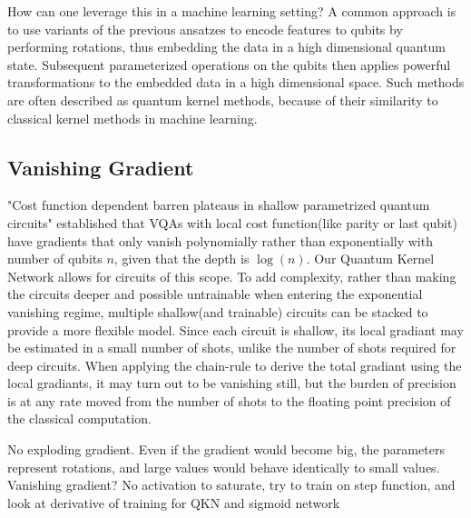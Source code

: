 \documentclass[]{article}
\begin{document}
How can one leverage this in a machine learning setting? A common approach is to use variants of the previous ansatzes to encode features to qubits by performing rotations, thus embedding the data in a high dimensional quantum state. Subsequent parameterized operations on the qubits then applies powerful transformations to the embedded data in a high dimensional space. Such methods are often described as quantum kernel methods, because of their similarity to classical kernel methods in machine learning.

\subsection{Vanishing Gradient}
"Cost function dependent barren plateaus in shallow parametrized quantum circuits" established that VQAs with local cost function(like parity or last qubit) have gradients that only vanish polynomially rather than exponentially with number of qubits $n$, given that the depth is $\log(n)$. Our Quantum Kernel Network allows for circuits of this scope. To add complexity, rather than making the circuits deeper and possible untrainable when entering the exponential vanishing regime, multiple shallow(and trainable) circuits can be stacked to provide a more flexible model. Since each circuit is shallow, its local gradiant may be estimated in a small number of shots, unlike the number of shots required for deep circuits. When applying the chain-rule to derive the total gradiant using the local gradiants, it may turn out to be vanishing still, but the burden of precision is at any rate moved from the number of shots to the floating point precision of the classical computation.  

No exploding gradient. Even if the gradient would become big, the parameters represent rotations, and large values would behave identically to small values. Vanishing gradient? No activation to saturate, try to train on step function, and look at derivative of training for QKN and sigmoid network

\newpage
\printbibliography[heading=bibintoc, title={References}]
\end{document}
